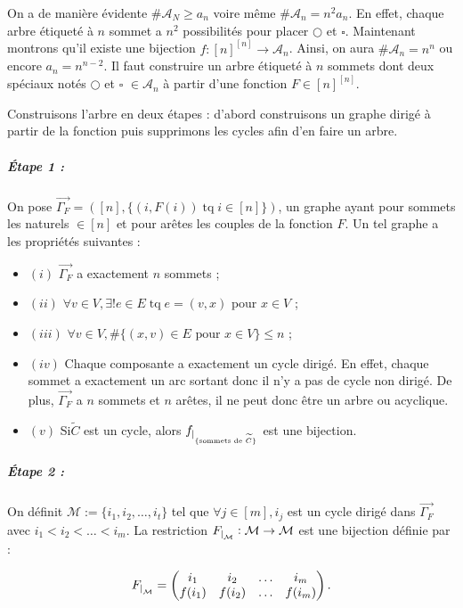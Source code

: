 \documentclass{article}
\newenvironment{lst}
	{\begin{minipage}[t]{.9\linewidth}\begin{itemize}}
	{\end{itemize}\end{minipage}}
\DeclareMathOperator{\tq}{\text{ tq }}
\begin{document}
			On a de manière évidente $\#\mathcal A_N \geq a_n$ voire même $\#\mathcal A_n = n^2a_n$. En effet, chaque arbre étiqueté à $n$ sommet a $n^2$ possibilités pour
			placer $\bigcirc$ et $\square$. Maintenant montrons qu'il existe une bijection $f : [n]^{[n]} \to \mathcal A_n$. Ainsi, on aura $\#\mathcal A_n = n^n$ ou encore
			$a_n = n^{n-2}$. Il faut construire un arbre étiqueté à $n$ sommets dont deux spéciaux notés $\bigcirc$ et $\square$ $\in \mathcal A_n$ à partir d'une fonction
			$F \in [n]^{[n]}$.

			Construisons l'arbre en deux étapes  : d'abord construisons un graphe dirigé à partir de la fonction puis supprimons les cycles afin d'en faire un arbre.

			\subparagraph{Étape 1 :} On pose $\vec{\Gamma_F} = ([n], \{(i, F(i)) \tq i \in [n]\})$, un graphe ayant pour sommets les naturels $\in [n]$
			et pour arêtes les couples de la fonction $F$. Un tel graphe a les propriétés suivantes :

				\begin{lst}
					\item[$(i)$] $\vec {\Gamma_F}$ a exactement $n$ sommets ;
					\item[$(ii)$] $\forall v \in V, \exists! e \in E \tq e = (v, x)$ pour $x \in V$ ;
					\item[$(iii)$]  $\forall v \in V, \#\{(x, v) \in E \text{ pour $x \in V$}\} \leq n$ ;
					\item[$(iv)$] Chaque composante a exactement un cycle dirigé. En effet, chaque sommet a exactement un arc sortant donc il n'y a pas de cycle non dirigé.
								  De plus, $\vec {\Gamma_F}$ a $n$ sommets et $n$ arêtes, il ne peut donc être un arbre ou acyclique.
					\item[$(v)$] Si$\widetilde C$ est un cycle, alors $f_{\sVert[0]_{\{\text{sommets de $\widetilde C$}\}}}$ est une bijection.
				\end{lst}

			\subparagraph{Étape 2 : }On définit $\mathcal M := \{i_1, i_2, \ldots, i_t\}$ tel que $\forall j \in [m], i_j$ est un cycle dirigé dans $\vec {\Gamma_F}$ avec
			$i_1 < i_2 < \ldots < i_m$. La restriction $F_{\sVert[0]_{\mathcal M}}: \mathcal M \to \mathcal M$ est une bijection définie par :

			\[F_{\sVert[0]_{\mathcal M}}= \begin{pmatrix}i_1 & i_2 & \ldots & i_m \\f(i_1) & f(i_2) & \ldots & f(i_m)\end{pmatrix}.\]
\end{document}
